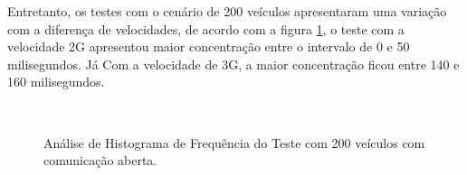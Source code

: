 \documentclass[
	12pt,				%
	oneside,			%
	a4paper,			%
	english,			%
	brazil				%
	]{abntex2ppgsi}
\begin{document}
Entretanto, os testes com o cenário de 200 veículos apresentaram uma variação com a diferença de velocidades, de acordo com a figura \ref{fig:imgHistFreq200}, o teste com a velocidade 2G apresentou maior concentração entre o intervalo de 0 e 50 milisegundos. Já Com a velocidade de 3G, a maior concentração ficou entre 140 e 160 milisegundos.
 
\begin{figure}[h!]
	\caption{Análise de Histograma de Frequência do Teste  com 200 veículos com comunicação aberta.}
	\centering
	\label{fig:imgHistFreq200}
	\\
\end{figure}
\end{document}
